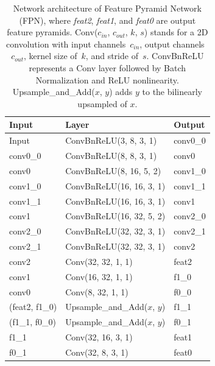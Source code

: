 \begin{table}[!t]
    \begin{center}
        \begin{threeparttable}
            \begin{tabular}{lll}
            Input &  Layer & Output  \\
            \hline
            Input & ConvBnReLU(3, 8, 3, 1) & conv0\_0  \\
            conv0\_0 & ConvBnReLU(8, 8, 3, 1) & conv0 \\
            conv0 & ConvBnReLU(8, 16, 5, 2) & conv1\_0 \\
            conv1\_0 & ConvBnReLU(16, 16, 3, 1) & conv1\_1 \\
            conv1\_1 & ConvBnReLU(16, 16, 3, 1) & conv1 \\
            conv1 & ConvBnReLU(16, 32, 5, 2) & conv2\_0 \\
            conv2\_0 & ConvBnReLU(32, 32, 3, 1) & conv2\_1 \\
            conv2\_1 & ConvBnReLU(32, 32, 3, 1) & conv2 \\
            conv2 & Conv(32, 32, 1, 1) & feat2 \\
            conv1 & Conv(16, 32, 1, 1) & f1\_0 \\
            conv0 & Conv(8, 32, 1, 1) & f0\_0 \\
            (feat2, f1\_0) & Upsample\_and\_Add($x$, $y$) & f1\_1 \\
            (f1\_1, f0\_0) & Upsample\_and\_Add($x$, $y$) & f0\_1 \\
            f1\_1 & Conv(32, 16, 3, 1) & feat1 \\
            f0\_1 & Conv(32, 8, 3, 1) & feat0 \\
            \hline
            \end{tabular}
        \end{threeparttable}
    \end{center}
    \caption{Network architecture of Feature Pyramid Network (FPN), where \textit{feat2}, \textit{feat1}, and \textit{feat0} are output feature pyramids. Conv($c_{in}$, $c_{out}$, $k$, $s$) stands for a 2D convolution with input channels~$c_{in}$, output channels~$c_{out}$, kernel size of~$k$, and stride of~$s$. ConvBnReLU represents a Conv layer followed by Batch Normalization and ReLU nonlinearity. Upsample\_and\_Add($x$, $y$) adds $y$ to the bilinearly upsampled of $x$.}
    \label{table:arch_fpn}
\end{table}

